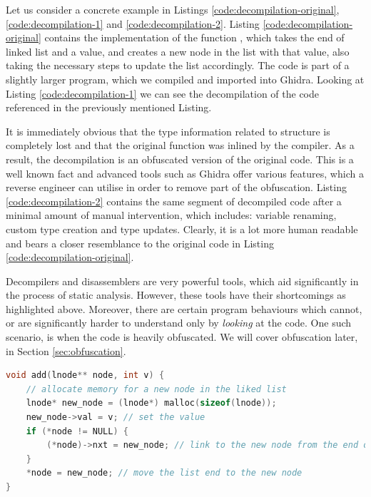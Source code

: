 Let us consider a concrete example in Listings \ref{code:decompilation-original}, \ref{code:decompilation-1} and \ref{code:decompilation-2}. Listing \ref{code:decompilation-original} contains the implementation of the function , which takes the end of linked list and a value, and creates a new node in the list with that value, also taking the necessary steps to update the list accordingly. The code is part of a slightly larger  program, which we compiled and imported into Ghidra. Looking at Listing \ref{code:decompilation-1} we can see the decompilation of the code referenced in the previously mentioned Listing. 

It is immediately obvious that the type information related to  structure is completely lost and that the original function was inlined by the compiler. As a result, the decompilation is an obfuscated version of the original code. This is a well known fact and advanced tools such as Ghidra offer various features, which a reverse engineer can utilise in order to remove part of the obfuscation. Listing \ref{code:decompilation-2} contains the same segment of decompiled code after a minimal amount of manual intervention, which includes: variable renaming, custom type creation and type updates. Clearly, it is a lot more human readable and bears a closer resemblance to the original code in Listing \ref{code:decompilation-original}. 

Decompilers and disassemblers are very powerful tools, which aid significantly in the process of static analysis. However, these tools have their shortcomings as highlighted above. Moreover, there are certain program behaviours which cannot, or are significantly harder to understand only by \emph{looking} at the code. One such scenario, is when the code is heavily obfuscated. We will cover obfuscation later, in Section \ref{sec:obfuscation}.

\begin{lstlisting}[language=c, label={code:decompilation-original}, caption={A function which adds an integer value \cc{v} to the end of a linked list.}]
void add(lnode** node, int v) {
    // allocate memory for a new node in the liked list
    lnode* new_node = (lnode*) malloc(sizeof(lnode));
    new_node->val = v; // set the value
    if (*node != NULL) {
        (*node)->nxt = new_node; // link to the new node from the end of the list
    }
    *node = new_node; // move the list end to the new node
}
\end{lstlisting}

